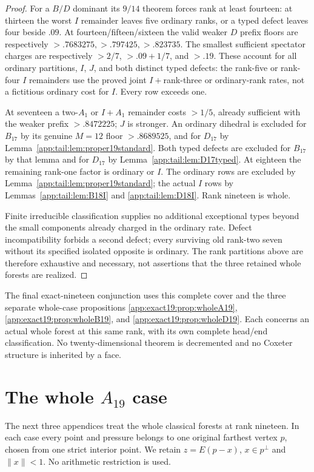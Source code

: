 \documentclass[11pt]{article}
\theoremstyle{definition}
\theoremstyle{remark}
\begin{document}
\begin{proof}
For a $B/D$ dominant its $9/14$ theorem forces rank at least
fourteen: at thirteen the worst $I$ remainder leaves five
ordinary ranks, or a typed defect leaves four beside $.09$.
At fourteen/fifteen/sixteen the valid weaker $D$ prefix
floors are respectively
$>.7683275,\allowbreak >.797425,\allowbreak >.823735$.
The smallest sufficient spectator charges are respectively
$>2/7$, $>.09+1/7$, and $>.19$.
These account for all ordinary partitions, $I$, $J$, and
both distinct typed defects: the rank-five or rank-four
$I$ remainders use the proved joint $I+$rank-three or
ordinary-rank rates, not a fictitious ordinary cost for $I$.
Every row exceeds one.

At seventeen a two-$A_1$ or $I+A_1$ remainder costs $>1/5$,
already sufficient with the weaker prefix $>.8472225$;
$J$ is stronger. An ordinary dihedral is excluded for
$B_{17}$ by its genuine $M=12$ floor $>.8689525$, and for
$D_{17}$ by Lemma~\ref{app:tail:lem:proper19standard}.
Both typed defects are excluded for $B_{17}$ by that lemma
and for $D_{17}$ by Lemma~\ref{app:tail:lem:D17typed}.
At eighteen the remaining rank-one factor is ordinary or
$I$. The ordinary rows are excluded by
Lemma~\ref{app:tail:lem:proper19standard}; the actual $I$
rows by Lemmas~\ref{app:tail:lem:B18I} and
\ref{app:tail:lem:D18I}. Rank nineteen is whole.

Finite irreducible classification supplies no additional
exceptional types beyond the small components already charged
in the ordinary rate. Defect incompatibility forbids a second
defect; every surviving old rank-two seven without its specified
isolated opposite is ordinary. The rank partitions above are
therefore exhaustive and necessary, not assertions that the
three retained whole forests are realized.
\end{proof}

The final exact-nineteen conjunction uses this complete cover and
the three separate whole-case propositions
\ref{app:exact19:prop:wholeA19},
\ref{app:exact19:prop:wholeB19}, and
\ref{app:exact19:prop:wholeD19}.
Each concerns an actual whole forest at this same rank, with its
own complete head/end classification. No twenty-dimensional theorem
is decremented and no Coxeter structure is inherited by a face.

\section[The whole A19 case]{The whole \(A_{19}\) case}
\label{app:exact19:wholeclassical}
The next three appendices treat the whole classical forests at rank
nineteen. In each case every point and pressure belongs to one
original farthest vertex \(p\), chosen from one strict interior point.
We retain \(z=E(p-x)\), \(x\in p^\perp\) and \(\|x\|<1\).
No arithmetic restriction is used.
\end{document}
